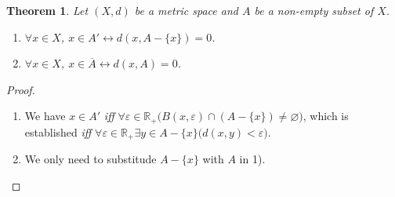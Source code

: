 \documentclass[openany]{book}
\theoremstyle{plain}
\newtheorem{theorem}{Theorem}[section] %
\theoremstyle{definition}
\begin{document}
\begin{theorem}
Let $(X,d)$ be a metric space and $A$ be a non-empty subset of $X$.
\begin{enumerate}[label=\arabic*)]
\item $\forall x\in X$, $x\in A' \leftrightarrow d(x,A-\{x\}) = 0$.
\item $\forall x\in X$, $x\in \overline A \leftrightarrow d(x,A)=0$.
\end{enumerate}
\end{theorem}
\begin{proof}
\begin{enumerate}[label=\arabic*)]
\item We have $x\in A' $ \emph{iff} $\forall \varepsilon\in \mathbb R_+\big(
	B (x,\varepsilon) \cap (A-\{x\}) \neq \varnothing\big)$, 
which is established \emph{iff} $\forall \varepsilon \in \mathbb R_+\exists y\in A-\{x\}\big(
	d(x,y) <\varepsilon\big)$.
\item We only need to substitude $A-\{x\}$ with $A$ in 1).
\end{enumerate}
\end{proof}
\end{document}
